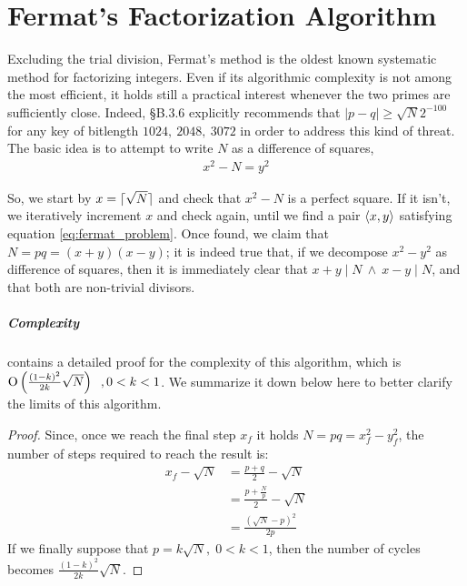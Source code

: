 \chapter{Fermat's Factorization Algorithm \label{chap:fermat}}

Excluding the trial division, Fermat's method is the oldest known systematic
method for factorizing integers. Even if its algorithmic complexity is not
among the most efficient, it holds still a practical interest whenever
the two primes are sufficiently close.
Indeed, \cite{DSS2009} \S B.3.6 explicitly recommends that
$|p-q| \geq \sqrt{N}2^{-100}$
for any key of bitlength $1024,\ 2048,\ 3072$ in order to address this kind of
threat.\\
The basic idea is to attempt to write $N$ as a difference of squares,
\begin{align}
\label{eq:fermat_problem}
x^2 - N = y^2
\end{align}

So, we start by $x = \lceil\sqrt{N}\rceil$ and check that $x^2-N$ is a perfect
square. If it isn't, we iteratively increment $x$ and check again, until we
find a pair $\langle x, y\rangle$ satisfying equation \ref{eq:fermat_problem}.
Once found, we claim that $N = pq = (x+y)(x-y)$; it is indeed true that, if we
decompose $x^2 - y^2$ as difference of squares, then it is immediately clear
that $x+y \mid N \ \land \  x-y \mid N$, and that both are non-trivial
divisors.

\paragraph{Complexity} \cite{riesel} contains a detailed proof for the
complexity of this algorithm, which is
$\operatorname{O}\left(\frac{(1-k)^2}{2k} \sqrt{N}\right) \;\;,  0 < k < 1$. We summarize it down
below here to better clarify the limits of this algorithm.

\begin{proof}
  Since, once we reach the final step $x_f$ it holds $N = pq = x_f^2 - y_f^2$,
  the number of steps required to reach the result is:
  \begin{align*}
    x_f - \sqrt{N} &= \frac{p + q}{2} - \sqrt{N} \\
                   &= \frac{p + \frac{N}{p}}{2} - \sqrt{N} \\
                   &= \frac{(\sqrt{N} - p)^2}{2p}
  \end{align*}
  If we finally suppose that $p = k\sqrt{N}, \; 0 < k < 1$, then the number of cycles
  becomes
  $\frac{(1-k)^2}{2k} \sqrt{N}$.
\end{proof}

